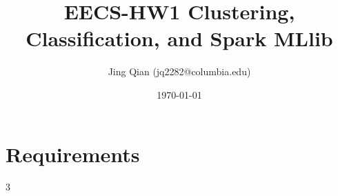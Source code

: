 \documentclass{article}
\title{EECS-HW1 Clustering, Classification, and Spark MLlib}
\author{Jing Qian (jq2282@columbia.edu)}
\date{\today}
\begin{document}
\maketitle

\section*{Requirements}

3
\end{document}
